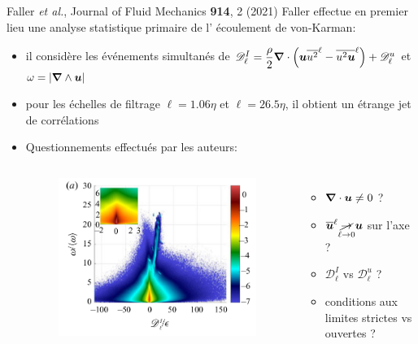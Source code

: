 \documentclass[aspectratio=169,usenames,dvipsnames]{beamer}
\newcommand{\filt}[1]{\overline{#1}^\ell}
\begin{document}
\begin{frame}{Faller \emph{et al.}, Journal of Fluid Mechanics {\bf 914}, 2 (2021)}
    Faller effectue en premier lieu une analyse statistique primaire de l' écoulement de von-Karman:
    \begin{itemize}[label=]
        \item il considère les événements simultanés de $\mathscr{D}^I_\ell=
        \dfrac{\rho}{2}\grad\cdot\qty(\git{u}\filt{u^2}-\filt{u^2\git{u}}) 
        + \mathscr{D}^u_\ell$ et $\omega=|\grad\wedge \boldsymbol{u}|$\pause
        \item pour les échelles de filtrage $\ell=1.06\eta$ et $\ell=26.5\eta$,
             il obtient un étrange jet de corrélations\pause
        \item Questionnements effectués par les auteurs:
            \begin{columns}
            \begin{figure}[h]
                \centering
                \includegraphics[width=\linewidth, height=0.6\textheight]{figs/faller_l1_dns_2.png}
            \end{figure}\pause
              \begin{itemize}[label=]
                \item $\grad\cdot\boldsymbol{u} \neq 0$ ?\pause
                \item $\filt{\git{u}}\underset{\ell\to 0}{\cancel\to} \git{u}$ sur l'axe ?\pause
                \item $\mathscr{D}^I_\ell$ vs $\mathscr{D}^u_\ell$ ?\pause
                \item conditions aux limites strictes vs ouvertes ?
              \end{itemize}
            \end{columns}
    \end{itemize}
\end{frame}
\end{document}
